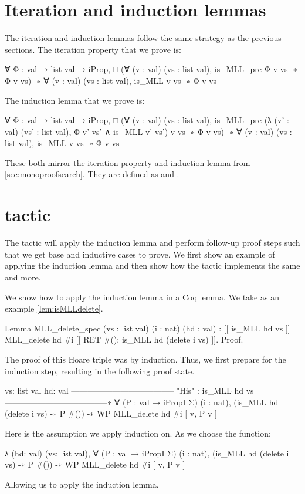 \documentclass[thesis.tex]{subfiles}
\begin{document}
{\section{Iteration and induction lemmas}\label{sec:constriterind}
The iteration and induction lemmas follow the same strategy as the previous sections. The iteration property that we prove is:
\begin{coqcode}
  ∀ Φ : val → list val → iProp,
       □ (∀ (v : val) (vs : list val), 
            is_MLL_pre Φ v vs -∗ Φ v vs) 
    -∗ ∀ (v : val) (vs : list val), is_MLL v vs -∗ Φ v vs
\end{coqcode}
The induction lemma that we prove is:
\begin{coqcode}
  ∀ Φ : val → list val → iProp,
       □ (∀ (v : val) (vs : list val), 
               is_MLL_pre 
                  (λ (v' : val) (vs' : list val), 
                    Φ v' vs' ∧ is_MLL v' vs') 
                  v vs 
            -∗ Φ v vs) 
    -∗ ∀ (v : val) (vs : list val), is_MLL v vs -∗ Φ v vs
\end{coqcode}
These both mirror the iteration property and induction lemma from \cref{sec:monoproofsearch}. They are defined as  and .

\section{ tactic}\label{sec:inductiontactic}
The  tactic will apply the induction lemma and perform follow-up proof steps such that we get base and inductive cases to prove. We first show an example of applying the induction lemma and then show how the  tactic implements the same and more.

\begin{example}{}{}
  We show how to apply the induction lemma in a Coq lemma.
  We take as an example \cref{lem:isMLLdelete}.
  \begin{coqcode}
    Lemma MLL_delete_spec (vs : list val) 
                          (i : nat) (hd : val) :
      [[{ is_MLL hd vs }]]
        MLL_delete hd #i
      [[{ RET #(); is_MLL hd (delete i vs) }]].
    Proof.
  \end{coqcode}
  The proof of this Hoare triple was by induction. Thus, we first prepare for the induction step, resulting in the following proof state.
  \begin{coqcode}
    vs: list val
    hd: val
    --------------------------------------
    "His" : is_MLL hd vs
    --------------------------------------∗
    ∀ (P : val → iPropI Σ) (i : nat),
      (is_MLL hd (delete i vs) -∗ P #()) -∗ 
      WP MLL_delete hd #i [{ v, P v }]
  \end{coqcode}
  Here  is the assumption we apply induction on. As  we choose the function:
  \begin{coqcode}
    λ (hd: val) (vs: list val), 
      ∀ (P : val → iPropI Σ) (i : nat),
        (is_MLL hd (delete i vs) -∗ P #()) -∗ 
        WP MLL_delete hd #i [{ v, P v }]
  \end{coqcode}
  Allowing us to apply the induction lemma.
\end{example}

}
\end{document}
